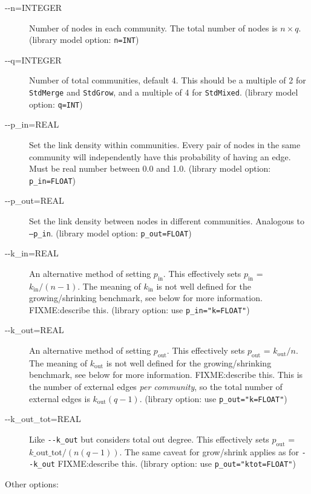 \documentclass{article}
\def\pin{p_\mathrm{in}}
\def\pout{p_\mathrm{out}}
\def\kin{k_\mathrm{in}}
\def\kout{k_\mathrm{out}}
\def\code#1{\texttt{#1}}
\begin{document}
\begin{description}
\item[-{}-n=INTEGER] Number of nodes in each community.  The total
  number of nodes is $n\times q$.  (library model option: \code{n=INT})
\item[-{}-q=INTEGER] Number of total communities, default 4.  This
  should be a multiple of 2 for \texttt{StdMerge} and
  \texttt{StdGrow}, and a multiple of 4 for \texttt{StdMixed}.
  (library model option: \code{q=INT})
\item[-{}-p\_in=REAL] Set the link density within communities.  Every
  pair of nodes in the same community will independently have this
  probability of having an edge.  Must be real number between 0.0 and
  1.0.  (library model option: \code{p\_in=FLOAT})
\item[-{}-p\_out=REAL] Set the link density between nodes in different
  communities.  Analogous to \code{--p\_in}.  (library model option:
  \code{p\_out=FLOAT})
\item[-{}-k\_in=REAL] An alternative method of setting $\pin$.  This
  effectively sets $\pin$ = $\kin/(n-1)$.  The meaning of $\kin$ is
  not well defined for the growing/shrinking benchmark, see below for
  more information.  FIXME:describe this. (library option: use
  \code{p\_in="k=FLOAT"})
\item[-{}-k\_out=REAL] An alternative method of setting $\pout$.  This
  effectively sets $\pout$ = $\kout/n$.  The meaning of $\kout$ is not
  well defined for the growing/shrinking benchmark, see below for more
  information.  FIXME:describe this. This is the number of external
  edges \textsl{per community}, so the total number of external edges
  is $\kout(q-1)$.  (library option: use \code{p\_out="k=FLOAT"})
\item[-{}-k\_out\_tot=REAL] Like \texttt{-{}-k\_out} but considers total
  out degree.  This effectively sets $\pout$ =
  $k\_\mathrm{out\_tot}/(n(q-1))$.  The same caveat for grow/shrink
  applies as for \code{-{}-k\_out} FIXME:describe this.  (library
  option: use \code{p\_out="ktot=FLOAT"})
\end{description}

\vspace{.5cm}

\noindent
Other options:
\end{document}
